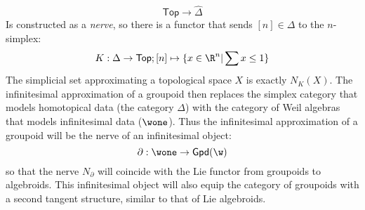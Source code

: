 \[
	\mathsf{Top} \to \widehat{\Delta}
\]
Is constructed as a \emph{nerve}, so there is a functor that sends $[n] \in \Delta$ to the $n$-simplex:
\[
	K: \Delta \to \mathsf{Top}; [n] \mapsto \{ x \in \R^n | \sum x \le 1 \}
\] 
The simplicial set approximating a topological space $X$ is exactly $N_K(X)$. The infinitesimal approximation of a groupoid then replaces the simplex category that models homotopical data (the category $\Delta$) with the category of Weil algebras that models infinitesimal data ($\wone$). Thus the infinitesimal approximation of a groupoid will be the nerve of an infinitesimal object:
\[
	\partial: \wone \to \mathsf{Gpd}(\w)
\] so that the nerve $N_\partial$ will coincide with the Lie functor from groupoids to algebroids. This infinitesimal object will also equip the category of groupoids with a second tangent structure, similar to that of Lie algebroids.

